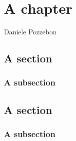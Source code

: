 \chapter{A chapter}

Daniele Pozzebon \cite{doi:10.1021/acscentsci.0c00984}

\section{A section}

\lipsum[4]

\subsection{A subsection}

\lipsum[4]

\section{A section}

\lipsum[4]

\subsection{A subsection}

\lipsum[4]
